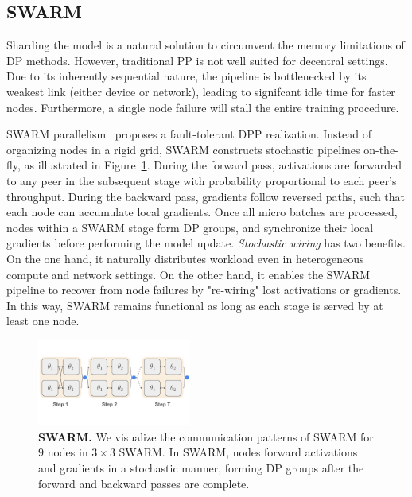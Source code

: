 \documentclass{article}
\begin{document}
\subsection{SWARM}


Sharding the model is a natural solution to circumvent the memory limitations of
DP methods. However, traditional PP is not well suited for decentral settings.
Due to its inherently sequential nature, the pipeline is bottlenecked by its
weakest link (either device or network), leading to signifcant idle time for
faster nodes. Furthermore, a single node failure will stall the entire training
procedure.

SWARM parallelism~\cite{ryabinin2023swarm} proposes a fault-tolerant DPP
realization. Instead of organizing nodes in a rigid grid, SWARM constructs
stochastic pipelines on-the-fly, as illustrated in Figure~\ref{fig:swarm}.
During the forward pass, activations are forwarded to any peer in the subsequent
stage with probability proportional to each peer's throughput. During the
backward pass, gradients follow reversed paths, such that each node can
accumulate local gradients. Once all micro batches are processed, nodes within a
SWARM stage form DP groups, and synchronize their local gradients before
performing the model update. \textit{Stochastic wiring} has two benefits. On the
one hand, it naturally distributes workload even in heterogeneous compute and
network settings. On the other hand, it enables the SWARM pipeline to recover
from node failures by "re-wiring" lost activations or gradients. In this way,
SWARM remains functional as long as each stage is served by at least one node.
\begin{figure}[ht]
    \centering
    \includegraphics[width=0.45\textwidth]{figures/swarm.pdf}
    \caption{\textbf{SWARM.} We visualize the communication patterns of SWARM
    for $9$ nodes in $3\times 3$ SWARM. In SWARM, nodes forward activations and
    gradients in a stochastic manner, forming DP groups after the forward and
    backward passes are complete.}
    \label{fig:swarm}
\end{figure}
\end{document}
